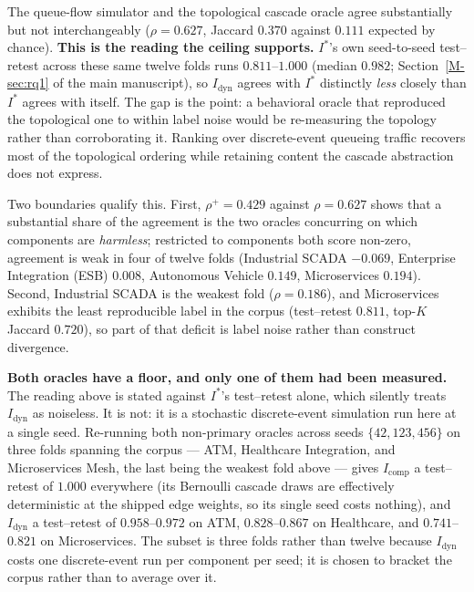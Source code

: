 \documentclass[preprint,3p]{elsarticle}
\begin{document}
\noindent The queue-flow simulator and the topological cascade oracle agree substantially but not interchangeably ($\rho = 0.627$, Jaccard $0.370$ against $0.111$ expected by chance). \textbf{This is the reading the ceiling supports.} $I^*$'s own seed-to-seed test--retest across these same twelve folds runs $0.811$--$1.000$ (median $0.982$; Section~\ref{M-sec:rq1} of the main manuscript), so $I_{\text{dyn}}$ agrees with $I^*$ distinctly \emph{less} closely than $I^*$ agrees with itself. The gap is the point: a behavioral oracle that reproduced the topological one to within label noise would be re-measuring the topology rather than corroborating it. Ranking over discrete-event queueing traffic recovers most of the topological ordering while retaining content the cascade abstraction does not express.

\noindent Two boundaries qualify this. First, $\rho^{+} = 0.429$ against $\rho = 0.627$ shows that a substantial share of the agreement is the two oracles concurring on which components are \emph{harmless}; restricted to components both score non-zero, agreement is weak in four of twelve folds (Industrial SCADA $-0.069$, Enterprise Integration (ESB) $0.008$, Autonomous Vehicle $0.149$, Microservices $0.194$). Second, Industrial SCADA is the weakest fold ($\rho = 0.186$), and Microservices exhibits the least reproducible label in the corpus (test--retest $0.811$, top-$K$ Jaccard $0.720$), so part of that deficit is label noise rather than construct divergence.

\noindent\textbf{Both oracles have a floor, and only one of them had been measured.} The reading above is stated against $I^*$'s test--retest alone, which silently treats $I_{\text{dyn}}$ as noiseless. It is not: it is a stochastic discrete-event simulation run here at a single seed. Re-running both non-primary oracles across seeds $\{42, 123, 456\}$ on three folds spanning the corpus --- ATM, Healthcare Integration, and Microservices Mesh, the last being the weakest fold above --- gives $I_{\text{comp}}$ a test--retest of $1.000$ everywhere (its Bernoulli cascade draws are effectively deterministic at the shipped edge weights, so its single seed costs nothing), and $I_{\text{dyn}}$ a test--retest of $0.958$--$0.972$ on ATM, $0.828$--$0.867$ on Healthcare, and $0.741$--$0.821$ on Microservices. The subset is three folds rather than twelve because $I_{\text{dyn}}$ costs one discrete-event run per component per seed; it is chosen to bracket the corpus rather than to average over it.
\end{document}
